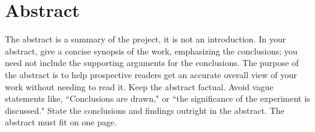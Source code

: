 \chapter*{Abstract}
The abstract is a summary of the project, it is not an introduction. In your abstract, give a concise synopsis of the work, emphasizing the conclusions; you need not include the supporting arguments for the conclusions. The purpose of the abstract is to help prospective readers get an accurate overall view of your work without needing to read it. Keep the abstract factual. Avoid vague statements like, ``Conclusions are drawn," or ``the significance of the experiment is discussed." State the conclusions and findings outright in the abstract. The abstract must fit on one page.
